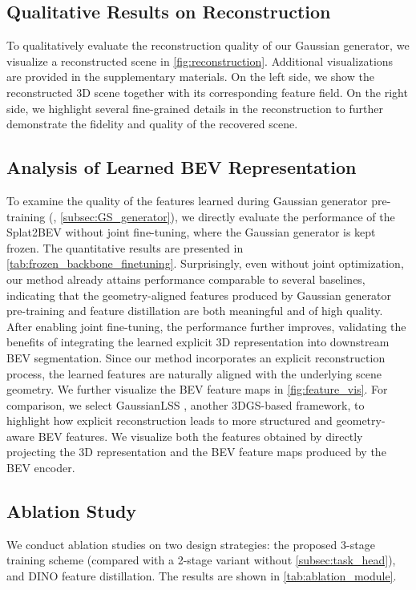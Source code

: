 \subsection{Qualitative Results on Reconstruction}
To qualitatively evaluate the reconstruction quality of our Gaussian generator, we visualize a reconstructed scene in \cref{fig:reconstruction}. Additional visualizations are provided in the supplementary materials. 
On the left side, we show the reconstructed 3D scene together with its corresponding feature field. 
On the right side, we highlight several fine-grained details in the reconstruction to further demonstrate the fidelity and quality of the recovered scene.

\subsection{Analysis of Learned BEV Representation}

To examine the quality of the features learned during Gaussian generator pre-training (\ie, \cref{subsec:GS_generator}), we directly evaluate the performance of the Splat2BEV without joint fine-tuning, where the Gaussian generator is kept frozen.
The quantitative results are presented in \cref{tab:frozen_backbone_finetuning}.
Surprisingly, even without joint optimization, our method already attains performance comparable to several baselines, indicating that the geometry-aligned features produced by Gaussian generator pre-training and feature distillation are both meaningful and of high quality. 
After enabling joint fine-tuning, the performance further improves, validating the benefits of integrating the learned explicit 3D representation into downstream BEV segmentation.
Since our method incorporates an explicit reconstruction process, the learned features are naturally aligned with the underlying scene geometry.
We further visualize the BEV feature maps in \cref{fig:feature_vis}.
For comparison, we select GaussianLSS \cite{lu2025toward}, another 3DGS-based framework, to highlight how explicit reconstruction leads to more structured and geometry-aware BEV features.
We visualize both the features obtained by directly projecting the 3D representation and the BEV feature maps produced by the BEV encoder.

\subsection{Ablation Study}

We conduct ablation studies on two design strategies: the proposed 3-stage training scheme (compared with a 2-stage variant without \cref{subsec:task_head}), and DINO feature distillation. 
The results are shown in \cref{tab:ablation_module}.

